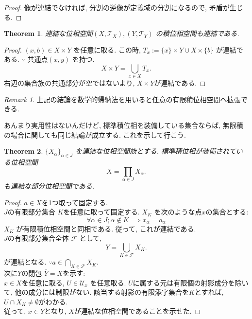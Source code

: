\documentclass[dvipdfmx]{jbook}
\newcommand{\cl}[1]{\overline{ #1}  }
\newtheorem{theorem}{Theorem}[section]
\theoremstyle{remark}
\newtheorem{remark}{Remark}[section]
\theoremstyle{plain}
\begin{document}
\begin{proof}
	像が連結でなければ, 分割の逆像が定義域の分割になるので, 矛盾が生じる.
\end{proof}

\begin{theorem}
	連結な位相空間$\left( X, \mathcal{T}_X \right) , \left( Y, \mathcal{T}_Y \right) $ の積位相空間も連結である.
\end{theorem}

\begin{proof}
	$(x,b) \in X \times Y $ を任意に取る. この時,
	$T_{x} := \{x\} \times Y \cup X \times \{b\}  $ が連結である. $\because$ 共通点$\left( x,y \right) $ を持つ.\\
	 \[
	X \times Y = \bigcup_{x \in X}T_x 
	.\] 
	右辺の集合族の共通部分が空ではないより, $X \times Y$が連結である.
\end{proof}

\begin{remark}
	上記の結論を数学的帰納法を用いると任意の有限積位相空間へ拡張できる.
\end{remark}

あんまり実用性はないんだけど, 標準積位相を装備している集合ならば, 無限積の場合に関しても同じ結論が成立する. これを示して行こう.

\begin{theorem}
	$\{X_{\alpha}\} _{\alpha \in J}$ を連結な位相空間族とする. 
	標準積位相が装備されている位相空間
	\[
	X = \prod_{\alpha \in J} X _{\alpha}  
	.\] 
	も連結な部分位相空間である.
\end{theorem}

\begin{proof}
	$a \in X$を1つ取って固定する.\\
	 $J$の有限部分集合 $K$を任意に取って固定する.  $X_{K}$ を次のような点$x$の集合とする:  
	 $$ 
	 \forall \alpha \in J; \alpha \notin K \implies x_{\alpha} = a_{\alpha}
	 $$ 
	 $X_{K}$ が有限積位相空間と同相である. 従って, これが連結である.\\
	 $J$の有限部分集合全体 $\mathcal{F}$ として, 
	  \[
	 Y = \bigcup_{K \in \mathcal{F} } X_{K} 
	 .\] 
	 が連結となる. $\because a \in \bigcap_{K \in \mathcal{F}} X_{K} $.\\
	 次に$Y$の閉包 $\cl{Y} = X$を示す: \\
	 $x \in X$を任意に取る,  $U \in \mathcal{U}_x$ を任意取る. 
	  $U$に属する元は有限個の射影成分を除いて, 他の成分には制限がない. 該当する射影の有限添字集合を$K$とすれば,  $U \cap X_{K} \neq \emptyset $がわかる.\\
	  従って, $x \in \cl{Y}$となり, $X$が連結な位相空間であることを示せた.
\end{proof}
\end{document}
